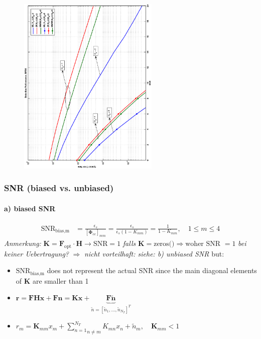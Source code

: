 \documentclass[a4paper, 10pt]{article}
\begin{document}
	\begin{figure}[h]
		\includegraphics[width = 0.6\textwidth, angle = -90]{MMSE_klein}
		\label{MMSE}
	\end{figure}
	
\subsubsection{SNR (biased vs. unbiased)}
\paragraph*{a) biased SNR}
\begin{align*}
	\text{SNR}_{\text{bias,m}} &= \frac{\epsilon_s}{[\boldsymbol{\Phi}_{ee}]_{mm}} = \frac{\epsilon_s}{\epsilon_s(1 - K_{mm})} = \frac{1}{1 - K_{mm}}, \quad 1\leq m \leq 4 
\end{align*}
	\textit{Anmerkung: } $\mathbf{K} = \mathbf{F}_{\text{opt}}\cdot\mathbf{H} \rightarrow \text{SNR} = 1 $ \textit{falls } $ \mathbf{K} = \text{zeros()} \Rightarrow \text{woher SNR } = 1 $ \textit{ bei keiner Uebertragung?} $\Rightarrow $ \textit{ nicht vorteilhaft: siehe: b) unbiased SNR}  %
but: 
\begin{itemize}
	\item $\text{SNR}_{\text{bias,m}} $ does not represent the actual SNR since the main diagonal elements of $ \mathbf{K} $ are smaller than 1
	\item $ \mathbf{r} = \mathbf{FHx} + \mathbf{Fn} = \mathbf{Kx} + \underbrace{\mathbf{F}\tilde{\mathbf{n}} }_{\tilde{n} = [\tilde{n}_1, \dots,\tilde{n}_{N_T}]^T } $
	\item $r_m = \mathbf{K}_{mm}x_m + \underset{ n\neq m}{\sum\limits^{N_T}_{n = 1}}K_{mn}x_n + \tilde{n}_m ,\quad \mathbf{K}_{mm} < 1 $
\end{itemize}
\end{document}
